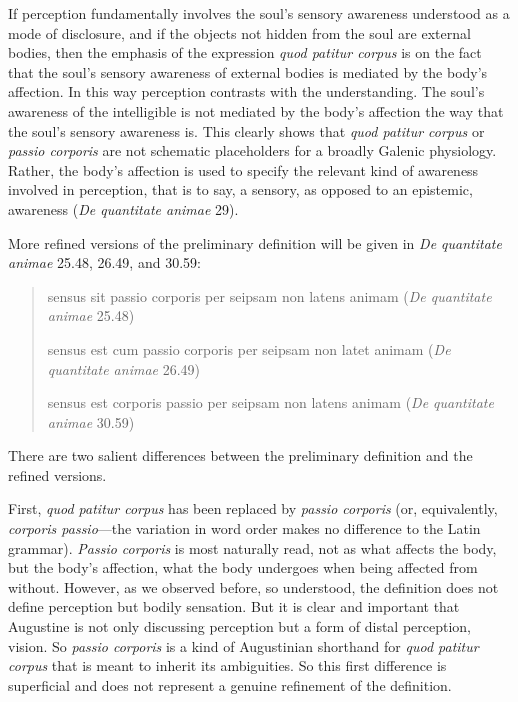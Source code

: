 \documentclass[12pt]{article}
\begin{document}
If perception fundamentally involves the soul's sensory awareness understood as a mode of disclosure, and if the objects not hidden from the soul are external bodies, then the emphasis of the expression \emph{quod patitur corpus} is on the fact that the soul's sensory awareness of external bodies is mediated by the body's affection. In this way perception contrasts with the understanding. The soul's awareness of the intelligible is not mediated by the body's affection the way that the soul's sensory awareness is. This clearly shows that \emph{quod patitur corpus} or \emph{passio corporis} are not schematic placeholders for a broadly Galenic physiology. Rather, the body's affection is used to specify the relevant kind of awareness involved in perception, that is to say, a sensory, as opposed to an epistemic, awareness (\emph{De quantitate animae} 29).

More refined versions of the preliminary definition will be given in \emph{De quantitate animae} 25.48, 26.49, and 30.59:
\begin{quote}
	sensus sit passio corporis per seipsam non latens animam (\emph{De quantitate animae} 25.48)
	
	sensus est cum passio corporis per seipsam non latet animam (\emph{De quantitate animae} 26.49)
	
	sensus est corporis passio per seipsam non latens animam (\emph{De quantitate animae} 30.59)
	\end{quote}
There are two salient differences between the preliminary definition and the refined versions.

First, \emph{quod patitur corpus} has been replaced by \emph{passio corporis} (or, equivalently, \emph{corporis passio}—the variation in word order makes no difference to the Latin grammar). \emph{Passio corporis} is most naturally read, not as what affects the body, but the body's affection, what the body undergoes when being affected from without. However, as we observed before, so understood, the definition does not define perception but bodily sensation. But it is clear and important that Augustine is not only discussing perception but a form of distal perception, vision. So \emph{passio corporis} is a kind of Augustinian shorthand for \emph{quod patitur corpus} that is meant to inherit its ambiguities. So this first difference is superficial and does not represent a genuine refinement of the definition.
\end{document}
